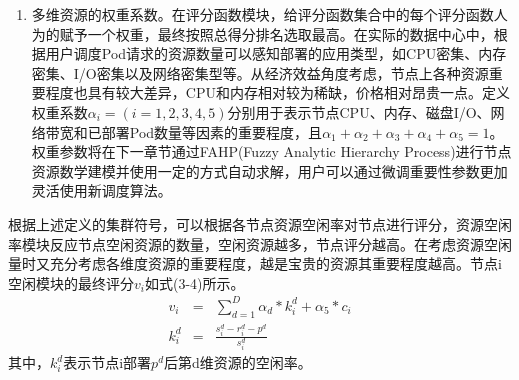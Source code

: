 \begin{enumerate}[(1)]
	\item 多维资源的权重系数。在评分函数模块，给评分函数集合中的每个评分函数人为的赋予一个权重，最终按照总得分排名选取最高。在实际的数据中心中，根据用户调度Pod请求的资源数量可以感知部署的应用类型，如CPU密集、内存密集、I/O密集以及网络密集型等。从经济效益角度考虑，节点上各种资源重要程度也具有较大差异，CPU和内存相对较为稀缺，价格相对昂贵一点。定义权重系数\begin{math}\alpha_{i}=(i=1, 2, 3, 4, 5)\end{math}分别用于表示节点CPU、内存、磁盘I/O、网络带宽和已部署Pod数量等因素的重要程度，且\begin{math}\alpha_{1}+\alpha_{2}+\alpha_{3}+\alpha_{4}+\alpha_{5}=1\end{math}。权重参数将在下一章节通过FAHP(Fuzzy Analytic Hierarchy Process)进行节点资源数学建模并使用一定的方式自动求解，用户可以通过微调重要性参数更加灵活使用新调度算法。
\end{enumerate}

根据上述定义的集群符号，可以根据各节点资源空闲率对节点进行评分，资源空闲率模块反应节点空闲资源的数量，空闲资源越多，节点评分越高。在考虑资源空闲量时又充分考虑各维度资源的重要程度，越是宝贵的资源其重要程度越高。节点i空闲模块的最终评分\begin{math}v_{i}\end{math}如式(3-4)所示。
\begin{eqnarray}
v_{i} & = & \sum_{d=1}^{D}\alpha_{d}*k_{i}^{d}+\alpha_{5}*c_{i} \\[0.3cm]
k_{i}^{d} & = & \frac{s_{i}^{d}-r_{i}^{d}-p^{d}}{s_{i}^{d}}
\end{eqnarray}
其中，\begin{math}k_{i}^{d}\end{math}表示节点i部署\begin{math}p^{d}\end{math}后第d维资源的空闲率。

